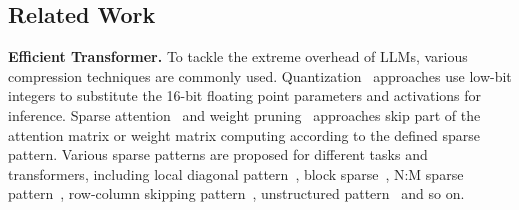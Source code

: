 \vspace{-5pt}
\subsection{Related Work}
\textbf{Efficient Transformer.}
To tackle the extreme overhead of LLMs, various compression techniques are commonly used.
Quantization~\citep{dettmers2022llm_int8, frantar2022gptq, yao2022zeroquant, xiao2023smoothquant,lin2023awq} approaches use low-bit integers to substitute the 16-bit floating point parameters and activations for inference. 
Sparse attention~\citep{child2019spTrans, zaheer2020bigbird, beltagy2020longformer, wang2021spatten, chen2023dynamic_nm} and weight pruning~\citep{frantar2023sparsegpt, kwon2022fast} approaches skip part of the attention matrix or weight matrix computing according to the defined sparse pattern. Various sparse patterns are proposed for different tasks and transformers, including local diagonal pattern~\citep{beltagy2020longformer}, block sparse~\citep{child2019spTrans, zaheer2020bigbird, kitaev2020reformer, kwon2022fast}, N:M sparse pattern~\citep{chen2023dynamic_nm, frantar2023sparsegpt}, row-column skipping pattern~\citep{wang2021spatten}, unstructured pattern~\citep{frantar2023sparsegpt} and so on.


